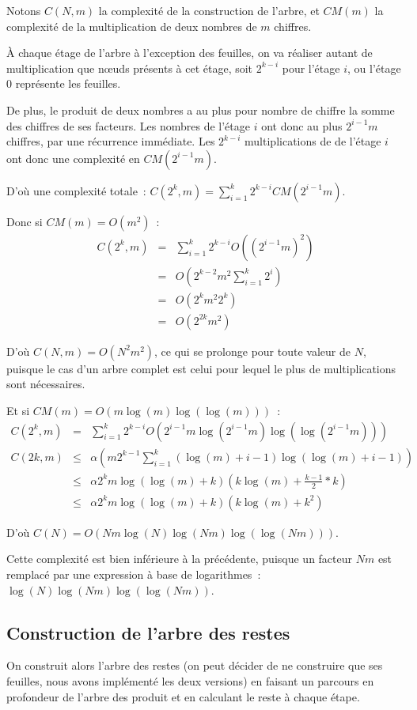 \documentclass[a4paper,10pt]{article}
\begin{document}
  Notons $C(N,m)$ la complexité de la construction de l'arbre, et $CM(m)$ la complexité de la multiplication de deux nombres de $m$ chiffres.
  
  À chaque étage de l'arbre à l'exception des feuilles, on va réaliser autant de multiplication que nœuds présents à cet étage, soit $2^{k-i}$ pour l'étage $i$, ou l'étage $0$ représente les feuilles.
  
  De plus, le produit de deux nombres a au plus pour nombre de chiffre la somme des chiffres de ses facteurs.
  Les nombres de l'étage $i$ ont donc au plus $2^{i-1}m$ chiffres, par une récurrence immédiate.
  Les $2^{k-i}$ multiplications de de l'étage $i$ ont donc une complexité en $CM(2^{i-1}m)$.
  
  D'où une complexité totale~: $C(2^k,m) = \sum_{i=1}^k 2^{k-i}CM(2^{i-1}m)$.
  
  Donc si $CM(m) = O(m^2)$~:
  \begin{eqnarray*}
   C(2^k,m) &=& \sum_{i=1}^k 2^{k-i}O({(2^{i-1}m)}^2)\\
   &=& O(2^{k-2}m^2\sum_{i=1}^k 2^i)\\
   &=& O(2^k m^2 2^k)\\
   &=& O(2^{2k} m^2)
  \end{eqnarray*}
  
  D'où $C(N,m) = O(N^2m^2)$, ce qui se prolonge pour toute valeur de $N$, puisque le cas d'un arbre complet est celui pour lequel le plus de multiplications sont nécessaires.
  
  Et si $CM(m) = O(m\log(m)\log(\log(m)))$~:
  \begin{eqnarray*}
   C(2^k,m) &=& \sum_{i=1}^k 2^{k-i}O(2^{i-1}m\log(2^{i-1}m)\log(\log(2^{i-1}m)))\\
   C(2k,m) &\leq& \alpha(m2^{k-1}\sum_{i=1}^k(\log(m)+i-1)\log(\log(m)+i-1))\\
   &\leq& \alpha 2^k m \log(\log(m)+k)(k \log(m) + \frac{k-1}{2}*k)\\
   &\leq& \alpha 2^k m \log(\log(m)+k)(k\log(m)+k^2)
  \end{eqnarray*}
  
  D'où $C(N) = O(Nm\log(N)\log(Nm)\log(\log(Nm)))$.
  
  Cette complexité est bien inférieure à la précédente, puisque un facteur $Nm$ est remplacé par une expression à base de logarithmes~: $\log(N)\log(Nm)\log(\log(Nm))$.


  \subsection{Construction de l'arbre des restes}
  On construit alors l'arbre des restes (on peut décider de ne construire que ses feuilles, nous avons implémenté les deux versions) en faisant un parcours en profondeur de l'arbre des produit et en calculant le reste à chaque étape.
  
\end{document}
